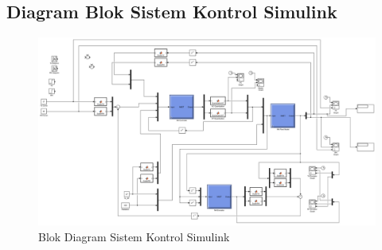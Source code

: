 \begin{landscape}
	\section{Diagram Blok Sistem Kontrol Simulink}
	\begin{figure}[!h]
		\centering
		\includegraphics[width=1.5\textwidth]{figures/SimulinkBlockDiagram}
		\caption{Blok Diagram Sistem Kontrol Simulink}
		\label{fig:C:SimulinkBlockDiagram}
	\end{figure}
\end{landscape}